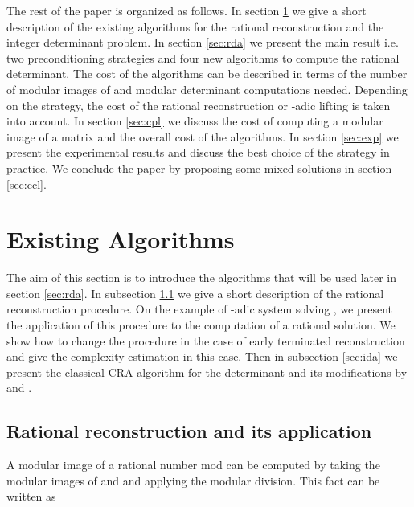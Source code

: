 \documentclass{acm_proc_article-sp}   \usepackage{graphicx,url}
\begin{document}
The rest of the paper is organized as follows. In section \ref{sec:ea} we give a short description of the existing algorithms for the rational reconstruction and the integer determinant problem. In section \ref{sec:rda} we present the main result i.e. two preconditioning strategies and four new algorithms to compute the rational determinant. The cost of the algorithms can be described in terms of the number of modular images of  and modular determinant computations needed. Depending on the strategy, the cost of the rational reconstruction or -adic lifting is taken into account. In section \ref{sec:cpl} we discuss the cost of computing a modular image of a matrix and the overall cost of the algorithms. In section \ref{sec:exp} we present the experimental results and discuss the best choice of the strategy in practice. We conclude the paper by proposing some mixed solutions in section \ref{sec:ccl}.



















\section{Existing Algorithms}\label{sec:ea}

The aim of this section is to introduce the algorithms that will be
used later in section \ref{sec:rda}. In subsection \ref{sec:rr} we
give a short description of the rational reconstruction procedure.
On the example of -adic system solving \cite{Dixon1982}, we
present the application of this procedure to the computation of a
rational solution. We show how to change the procedure in the case
of early terminated reconstruction \cite{Wang} and give the
complexity estimation in this case. Then in subsection \ref{sec:ida}
we present the classical CRA algorithm for the determinant and its
modifications by \cite{Abbott1999} and \cite{jgd:2006:det}.



\subsection{Rational reconstruction and its application}\label{sec:rr}

A modular image of a rational number  mod  can be
computed by taking the modular images of  and  and applying
the modular division. This fact can be written as
\end{document}
